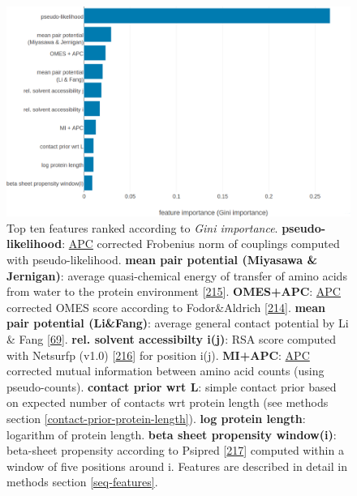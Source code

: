 \documentclass[11pt,a4paper,twoside]{book}
\theoremstyle{definition}
\theoremstyle{definition}
\theoremstyle{remark}
\begin{document}
\begin{figure}

{\centering \includegraphics[width=1\linewidth]{img/random_forest_contact_prior/additional_contat_score_features/feature_random_forest_top_pLLfeature} 

}

\caption{Top ten features
ranked according to \emph{Gini importance}. \textbf{pseudo-likelihood}:
\protect\hyperlink{abbrev}{APC} corrected Frobenius norm of couplings
computed with pseudo-likelihood. \textbf{mean pair potential (Miyasawa
\& Jernigan)}: average quasi-chemical energy of transfer of amino acids
from water to the protein environment
{[}\protect\hyperlink{ref-Miyazawa1999a}{215}{]}. \textbf{OMES+APC}:
\protect\hyperlink{abbrev}{APC} corrected OMES score according to
Fodor\&Aldrich {[}\protect\hyperlink{ref-Fodor2004a}{214}{]}.
\textbf{mean pair potential (Li\&Fang)}: average general contact
potential by Li \& Fang {[}\protect\hyperlink{ref-Li2011}{69}{]}.
\textbf{rel. solvent accessibilty i(j)}: RSA score computed with
Netsurfp (v1.0) {[}\protect\hyperlink{ref-Petersen2009a}{216}{]} for
position i(j). \textbf{MI+APC}: \protect\hyperlink{abbrev}{APC}
corrected mutual information between amino acid counts (using
pseudo-counts). \textbf{contact prior wrt L}: simple contact prior based
on expected number of contacts wrt protein length (see methods section
\ref{contact-prior-protein-length}). \textbf{log protein length}:
logarithm of protein length. \textbf{beta sheet propensity window(i)}:
beta-sheet propensity according to Psipred
{[}\protect\hyperlink{ref-Jones1999}{217}{]} computed within a window of
five positions around i. Features are described in detail in methods
section \ref{seq-features}.}\label{fig:feature-importance-rf-with-pll-score}
\end{figure}
\end{document}
